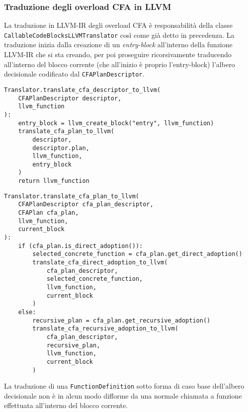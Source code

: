 \subsubsection{Traduzione degli overload CFA in LLVM}
La traduzione in LLVM-IR degli overload CFA è responsabilità della classe 
\texttt{CallableCodeBlocksLLVMTranslator} così come già detto in precedenza. La 
traduzione inizia dalla creazione di un \textit{entry-block} all'interno della 
funzione LLVM-IR che si sta creando, per poi proseguire ricorsivamente traducendo 
all'interno del blocco corrente (che all'inizio è proprio l'entry-block) l'albero 
decisionale codificato dal \texttt{CFAPlanDescriptor}. \\

\vspace{0.5cm}
\begin{lstlisting}[frame=single]   
Translator.translate_cfa_descriptor_to_llvm(
    CFAPlanDescriptor descriptor, 
    llvm_function
):
    entry_block = llvm_create_block("entry", llvm_function)
    translate_cfa_plan_to_llvm(
        descriptor, 
        descriptor.plan, 
        llvm_function, 
        entry_block
    )
    return llvm_function
\end{lstlisting}
\vspace{0.5cm}

\vspace{0.5cm}
\begin{lstlisting}[frame=single]   
Translator.translate_cfa_plan_to_llvm(
    CFAPlanDescriptor cfa_plan_descriptor, 
    CFAPlan cfa_plan,
    llvm_function,
    current_block
):
    if (cfa_plan.is_direct_adoption()):
        selected_concrete_function = cfa_plan.get_direct_adoption()
        translate_cfa_direct_adoption_to_llvm(
            cfa_plan_descriptor, 
            selected_concrete_function, 
            llvm_function, 
            current_block
        )
    else:
        recursive_plan = cfa_plan.get_recursive_adoption()
        translate_cfa_recursive_adoption_to_llvm(
            cfa_plan_descriptor, 
            recursive_plan, 
            llvm_function, 
            current_block
        )
\end{lstlisting}
\vspace{0.5cm}

\newpage

La traduzione di una \texttt{FunctionDefinition} sotto forma di caso base 
dell'albero decisionale non è in alcun modo difforme da una normale chiamata 
a funzione effettuata all'interno del blocco corrente. \\


